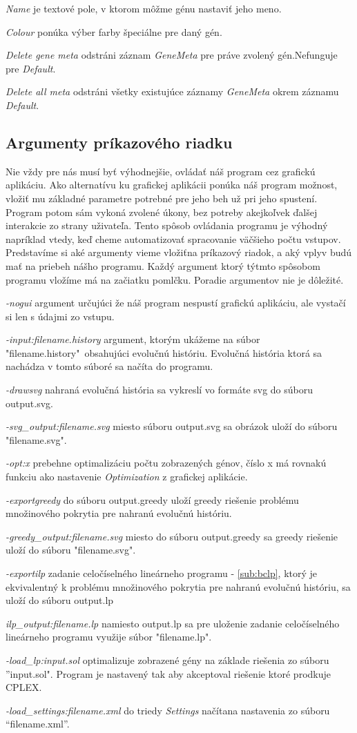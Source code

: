 \emph{Name} je textové pole, v ktorom môžme génu nastaviť jeho meno.

\emph{Colour} ponúka výber farby špeciálne pre daný gén.

\emph{Delete gene meta} odstráni záznam \emph{GeneMeta} pre práve zvolený gén.Nefunguje pre \emph{Default}.

\emph{Delete all meta} odstráni všetky existujúce záznamy \emph{GeneMeta} okrem záznamu \emph{Default}.

\subsection{Argumenty príkazového riadku}
Nie vždy pre nás musí byť výhodnejšie, ovládať náš program cez grafickú aplikáciu. 
Ako alternatívu ku grafickej aplikácii ponúka náš program možnost, vložiť mu základné parametre potrebné pre jeho beh už pri jeho spustení.
Program potom sám vykoná zvolené úkony, bez potreby akejkoľvek ďalšej interakcie zo strany uživateľa. 
Tento spôsob ovládania programu je výhodný napríklad vtedy, keď cheme automatizovať spracovanie väčšieho počtu vstupov.
Predstavíme si aké argumenty vieme vložiťna príkazový riadok, a aký vplyv budú mať na priebeh nášho programu. 
Každý argument ktorý týtmto spôsobom programu vložíme má na začiatku pomlčku. Poradie argumentov nie je dôležité.

\emph{-nogui} argument určujúci že náš program nespustí grafickú aplikáciu, ale vystačí si len s údajmi zo vstupu.

\emph{-input:filename.history} argument, ktorým ukážeme na súbor "filename.history"\ obsahujúci evolučnú históriu.
Evolučná história ktorá sa nachádza v tomto súboré sa načíta do programu.

\emph{-drawsvg} nahraná evolučná história sa vykreslí vo formáte svg do súboru output.svg.

\emph{-svg\_output:filename.svg} miesto súboru output.svg sa obrázok uloží do súboru "filename.svg".

\emph{-opt:x} prebehne optimalizáciu počtu zobrazených génov, číslo x má rovnakú funkciu ako nastavenie \emph{Optimization} z grafickej aplikácie.

\emph{-exportgreedy} do súboru output.greedy uloží greedy riešenie problému množinového pokrytia pre nahranú evolučnú históriu.

\emph{-greedy\_output:filename.svg} miesto do súboru output.greedy sa greedy riešenie uloží do súboru "filename.svg".

\emph{-exportilp} zadanie celočíselného lineárneho programu - \ref{sub:bclp},
ktorý je ekvivalentný k problému množinového pokrytia pre nahranú evolučnú históriu, sa uloží do súboru output.lp

\emph{ilp\_output:filename.lp} namiesto output.lp sa pre uloženie zadanie celočíselného lineárneho programu využije súbor "filename.lp".

\emph{-load\_lp:input.sol} optimalizuje zobrazené gény na základe riešenia zo súboru ''input.sol".
Program je nastavený tak aby akceptoval riešenie ktoré prodkuje CPLEX.

\emph{-load\_settings:filename.xml} do triedy \emph{Settings} načítana nastavenia zo súboru ``filename.xml''.

